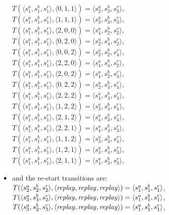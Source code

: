 \begin{itemize}
$T(\langle s^a_1, s^b_1, s^r_1 \rangle, \langle 0, 1, 1\rangle)=\langle s^a_2, s^b_3, s^r_3\rangle$, \\
$T(\langle s^a_1, s^b_1, s^r_1 \rangle, \langle 1, 1, 1\rangle)=\langle s^a_3, s^b_3, s^r_3\rangle$, \\
$T(\langle s^a_1, s^b_1, s^r_1 \rangle, \langle 2, 0, 0\rangle)=\langle s^a_4, s^b_2, s^r_2\rangle$, \\
$T(\langle s^a_1, s^b_1, s^r_1 \rangle, \langle 0, 2, 0\rangle)=\langle s^a_2, s^b_4, s^r_2\rangle$, \\
$T(\langle s^a_1, s^b_1, s^r_1 \rangle, \langle 0, 0, 2\rangle)=\langle s^a_2, s^b_2, s^r_4\rangle$, \\
$T(\langle s^a_1, s^b_1, s^r_1 \rangle, \langle 2, 2, 0\rangle)=\langle s^a_4, s^b_4, s^r_2\rangle$, \\
$T(\langle s^a_1, s^b_1, s^r_1 \rangle, \langle 2, 0, 2\rangle)=\langle s^a_4, s^b_2, s^r_4\rangle$, \\
$T(\langle s^a_1, s^b_1, s^r_1 \rangle, \langle 0, 2, 2\rangle)=\langle s^a_2, s^b_4, s^r_4\rangle$, \\
$T(\langle s^a_1, s^b_1, s^r_1 \rangle, \langle 2, 2, 2\rangle)=\langle s^a_4, s^b_4, s^r_4\rangle$, \\
$T(\langle s^a_1, s^b_1, s^r_1 \rangle, \langle 1, 2, 2\rangle)=\langle s^a_3, s^b_4, s^r_4\rangle$, \\
$T(\langle s^a_1, s^b_1, s^r_1 \rangle, \langle 2, 1, 2\rangle)=\langle s^a_4, s^b_3, s^r_4\rangle$, \\
$T(\langle s^a_1, s^b_1, s^r_1 \rangle, \langle 2, 2, 1\rangle)=\langle s^a_4, s^b_4, s^r_3\rangle$, \\
$T(\langle s^a_1, s^b_1, s^r_1 \rangle, \langle 1, 1, 2\rangle)=\langle s^a_3, s^b_3, s^r_4\rangle$, \\
$T(\langle s^a_1, s^b_1, s^r_1 \rangle, \langle 1, 2, 1\rangle)=\langle s^a_3, s^b_4, s^r_3\rangle$, \\
$T(\langle s^a_1, s^b_1, s^r_1 \rangle, \langle 2, 1, 1\rangle)=\langle s^a_4, s^b_3, s^r_3\rangle$,
\item
and the re-start transitions are:\\
$T(\langle s^a_2, s^b_2, s^r_2 \rangle, \langle \mathit{replay},\mathit{replay}, \mathit{replay} \rangle)=\langle s^a_1, s^b_1, s^r_1\rangle$,\\
$T(\langle s^a_3, s^b_3, s^r_2 \rangle, \langle \mathit{replay},\mathit{replay}, \mathit{replay} \rangle)=\langle s^a_1, s^b_1, s^r_1\rangle$,\\
$T(\langle s^a_3, s^b_2, s^r_3 \rangle, \langle \mathit{replay},\mathit{replay}, \mathit{replay} \rangle)=\langle s^a_1, s^b_1, s^r_1\rangle$,\\

\end{itemize}
